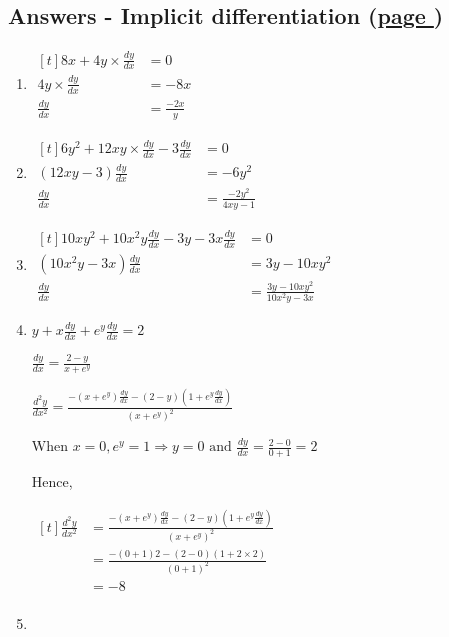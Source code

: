 \documentclass[../main.tex]{subfiles}
\begin{document}
\hypertarget{implicitdiffanswers}{\subsection*{Answers - Implicit differentiation (\hyperlink{implicitdifflink}{page \pageref{Implicit Differentiation}})}}

\label{Implicit differentiation answers}
\begin{spacing}{1.5}
\begin{enumerate}
    \item
    $
    \!
    \begin{aligned}[t]
        8x + 4y\times\frac{dy}{dx}
        &= 0 \\
        4y\times\frac{dy}{dx}
        &=-8x\\
        \frac{dy}{dx}
        &=\frac{-2x}{y}
    \end{aligned}
    $
    \item 
    $
    \!
    \begin{aligned}[t]
        6y^2+12xy\times\frac{dy}{dx}-3\frac{dy}{dx}
        &=0\\
        (12xy-3)\frac{dy}{dx}
        &=-6y^2\\
        \frac{dy}{dx}
        &=\frac{-2y^2}{4xy-1}
    \end{aligned}
    $
    \item 
    $
    \!
    \begin{aligned}[t]
        10xy^2+10x^2y\frac{dy}{dx}-3y-3x\frac{dy}{dx}
        &=0\\
        (10x^2y-3x)\frac{dy}{dx}
        &=3y-10xy^2\\
        \frac{dy}{dx}
        &=\frac{3y-10xy^2}{10x^2y-3x}
    \end{aligned}
    $
    \item 
    \(y+x\frac{dy}{dx}+e^y\frac{dy}{dx}=2\)

    \(\frac{dy}{dx}=\frac{2-y}{x+e^y} \) 

    \(\frac{d^2y}{dx^2}=\frac{-(x+e^y)\frac{dy}{dx}-(2-y)(1+e^y\frac{dy}{dx})}{(x+e^y)^2}\)

    When \(x=0, e^y=1\Rightarrow{}y=0\text{ and }\frac{dy}{dx}=\frac{2-0}{0+1}=2\)

    Hence,

    $
    \!
    \begin{aligned}[t]
        \frac{d^2y}{dx^2}
        &=\frac{-(x+e^y)\frac{dy}{dx}-(2-y)(1+e^y\frac{dy}{dx})}{(x+e^y)^2}\\
        &=\frac{-(0+1)2-(2-0)(1+2\times2)}{(0+1)^2}\\
        &=-8\\
    \end{aligned}
    $
    \item 
    

\end{enumerate}
\end{spacing}
\end{document}

